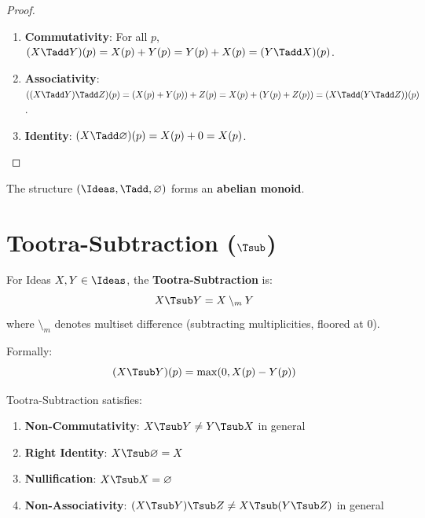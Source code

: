 \begin{proof}
\begin{enumerate}
  \item \textbf{Commutativity}: For all $p$, $(X \Tadd Y)(p) = X(p) + Y(p) = Y(p) + X(p) = (Y \Tadd X)(p)$.

  \item \textbf{Associativity}: $((X \Tadd Y) \Tadd Z)(p) = (X(p) + Y(p)) + Z(p) = X(p) + (Y(p) + Z(p)) = (X \Tadd (Y \Tadd Z))(p)$.

  \item \textbf{Identity}: $(X \Tadd \varnothing)(p) = X(p) + 0 = X(p)$.
\end{enumerate}
\end{proof}

\begin{corollary}
\label{cor:tadd-monoid}
The structure $(\Ideas, \Tadd, \varnothing)$ forms an \textbf{abelian monoid}.
\end{corollary}

\section{Tootra-Subtraction ($\Tsub$)}

\begin{definition}
\label{def:tootra-sub}
For Ideas $X, Y \in \Ideas$, the \textbf{Tootra-Subtraction} is:
\[
X \Tsub Y = X \setminus_m Y
\]
where $\setminus_m$ denotes multiset difference (subtracting multiplicities, floored at 0).

Formally:
\[
(X \Tsub Y)(p) = \max(0, X(p) - Y(p))
\]
\end{definition}

\begin{theorem}
\label{thm:tsub-properties}
Tootra-Subtraction satisfies:
\begin{enumerate}
  \item \textbf{Non-Commutativity}: $X \Tsub Y \neq Y \Tsub X$ in general
  \item \textbf{Right Identity}: $X \Tsub \varnothing = X$
  \item \textbf{Nullification}: $X \Tsub X = \varnothing$
  \item \textbf{Non-Associativity}: $(X \Tsub Y) \Tsub Z \neq X \Tsub (Y \Tsub Z)$ in general
\end{enumerate}
\end{theorem}

